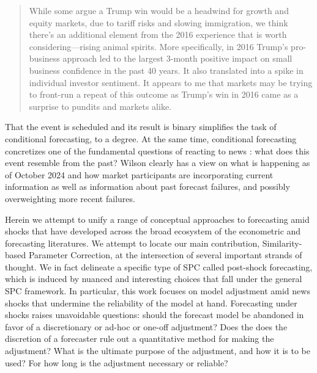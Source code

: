 \documentclass[11pt]{article}
\theoremstyle{definition}
\begin{document}
\begin{quote}While some argue a Trump win would be a headwind for growth and equity markets, due to tariff  risks and slowing immigration, we think there's an additional element from the 2016 experience that  is worth considering—rising animal spirits. More specifically, in 2016 Trump's pro-business approach  led to the largest 3-month positive impact on small business confidence in the past 40 years. It also translated into a spike in individual investor sentiment. It appears to me that markets may be trying  to front-run a repeat of this outcome as Trump's win in 2016 came as a surprise to pundits and  markets alike.
\end{quote}

That the event is scheduled and its result is binary simplifies the task of conditional forecasting, to a degree.  At the same time, conditional forecasting concretizes one of the fundamental questions of reacting to news \citep{lundquist2024volatility}: what does this event resemble from the past?  Wilson clearly has a view on what is happening as of October 2024 and how market participants are incorporating current information as well as information about past forecast failures, and possibly overweighting more recent failures.

Herein we attempt to unify a range of conceptual approaches to forecasting amid shocks that have developed across the broad ecosystem of the econometric and forecasting literatures.  We attempt to locate our main contribution, Similarity-based Parameter Correction, at the intersection of several important strands of thought.  We in fact delineate a specific type of SPC called post-shock forecasting, which is induced by nuanced and interesting choices that fall under the general SPC framework.  In particular, this work focuses on model adjustment amid news shocks that undermine the reliability of the  model at hand.  Forecasting under shocks raises unavoidable questions: should the forecast model be abandoned in favor of a discretionary or ad-hoc or one-off adjustment?  Does the does the discretion of a forecaster rule out a quantitative method for making the adjustment?  What is the ultimate purpose of the adjustment, and how it is to be used?  For how long is the adjustment necessary or reliable?
\end{document}
